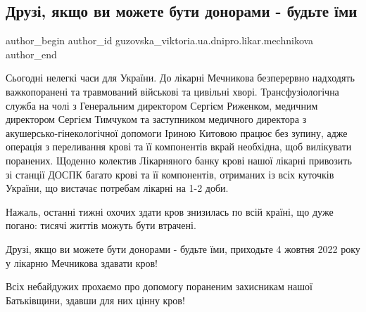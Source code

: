  
 
 
 
 

\subsection{Друзі, якщо ви можете бути донорами - будьте їми}
\label{sec:03_10_2022.fb.guzovska_viktoria.ua.dnipro.likar.mechnikova.1.druz___yakshcho_vi_m}

\ifcmt
 author_begin
   author_id guzovska_viktoria.ua.dnipro.likar.mechnikova
 author_end
\fi

Сьогодні нелегкі часи для України. До лікарні Мечникова безперервно надходять
важкопоранені та травмований військові та цивільні хворі. Трансфузіологічна
служба на чолі з Генеральним директором Сергієм Риженком, медичним директором
Сергієм Тимчуком та заступником медичного директора з акушерсько-гінекологічної
допомоги Іриною Китовою працює без зупину, адже операція з переливання крові та
її компонентів вкрай необхідна, щоб  вилікувати поранених. Щоденно колектив
Лікарняного банку крові нашої лікарні привозить зі станції ДОСПК багато крові
та її компонентів, отриманих із всіх куточків України, що вистачає потребам
лікарні на 1-2 доби.

Нажаль, останні тижні охочих здати кров знизилась по всій країні, що дуже
погано: тисячі життів можуть бути втрачені.

Друзі, якщо ви можете бути донорами - будьте їми, приходьте 4 жовтня 2022 року
у лікарню Мечникова здавати кров!

Всіх небайдужих прохаємо про допомогу пораненим захисникам нашої Батьківщини,
здавши для них цінну кров!
